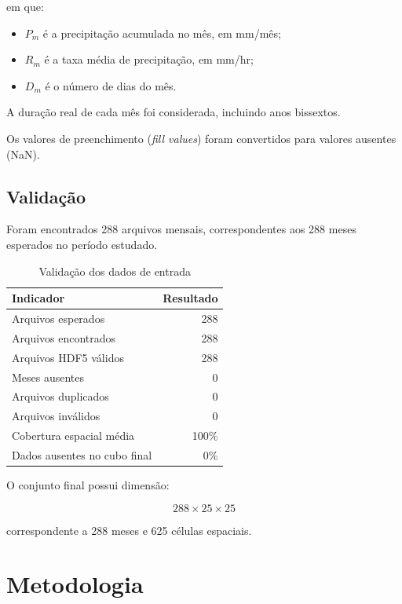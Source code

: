 \documentclass[12pt,a4paper]{article}
\begin{document}
em que:

\begin{itemize}
    \item $P_m$ é a precipitação acumulada no mês,
    em mm/mês;
    \item $R_m$ é a taxa média de precipitação,
    em mm/hr;
    \item $D_m$ é o número de dias do mês.
\end{itemize}

A duração real de cada mês foi considerada,
incluindo anos bissextos.

Os valores de preenchimento (\textit{fill values})
foram convertidos para valores ausentes (NaN).

\subsection{Validação}

Foram encontrados 288 arquivos mensais, correspondentes
aos 288 meses esperados no período estudado.

\begin{table}[H]
\centering
\caption{Validação dos dados de entrada}
\begin{tabular}{lr}
\toprule
Indicador & Resultado \\
\midrule
Arquivos esperados & 288 \\
Arquivos encontrados & 288 \\
Arquivos HDF5 válidos & 288 \\
Meses ausentes & 0 \\
Arquivos duplicados & 0 \\
Arquivos inválidos & 0 \\
Cobertura espacial média & 100\% \\
Dados ausentes no cubo final & 0\% \\
\bottomrule
\end{tabular}
\end{table}

O conjunto final possui dimensão:

\begin{equation}
288 \times 25 \times 25
\end{equation}

correspondente a 288 meses e 625 células espaciais.

\section{Metodologia}
\end{document}
